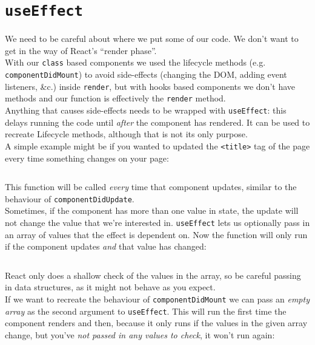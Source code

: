 \section{\texttt{useEffect}}

We need to be careful about where we put some of our code. We don't want to get in the way of React's ``render phase''.
\\

With our \texttt{class} based components we used the lifecycle methods (e.g. \\ \texttt{componentDidMount}) to avoid side-effects (changing the DOM, adding event listeners, \&c.) inside \texttt{render}, but with hooks based components we don't have methods and our function is effectively the \texttt{render} method.
\\

Anything that causes side-effects needs to be wrapped with \texttt{useEffect}: this delays running the code until \textit{after} the component has rendered. It can be used to recreate Lifecycle methods, although that is not its only purpose.
\\

A simple example might be if you wanted to updated the \texttt{<title>} tag of the page every time something changes on your page:

\inputminted{javascript}{04-hooks/figures/09-useEffect.js}

This function will be called \textit{every} time that component updates, similar to the behaviour of \texttt{componentDidUpdate}.
\\

Sometimes, if the component has more than one value in state, the update will not change the value that we're interested in. \texttt{useEffect} lets us optionally pass in an array of values that the effect is dependent on. Now the function will only run if the component updates \textit{and} that value has changed:

\inputminted{javascript}{04-hooks/figures/10-useEffect-dependents.js}

React only does a shallow check of the values in the array, so be careful passing in data structures, as it might not behave as you expect.
\\

If we want to recreate the behaviour of \texttt{componentDidMount} we can pass an \textit{empty array} as the second argument to \texttt{useEffect}. This will run the first time the component renders and then, because it only runs if the values in the given array change, but you've \textit{not passed in any values to check}, it won't run again:


